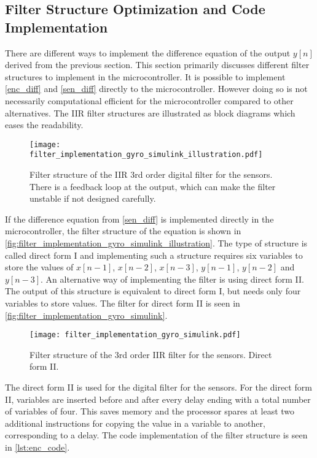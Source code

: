 \subsection{Filter Structure Optimization and Code Implementation}
There are different ways to implement the difference equation of the output $y[n]$ derived from the previous section. This section primarily discusses different filter structures to implement in the microcontroller. It is possible to implement \autoref{enc_diff} and \autoref{sen_diff} directly to the microcontroller. However doing so is not necessarily computational efficient for the microcontroller compared to other alternatives. The IIR filter structures are illustrated as block diagrams which eases the readability.
\begin{figure}[H]
    \centering
    \texttt{[image: filter\_implementation\_gyro\_simulink\_illustration.pdf]}
    \caption{Filter structure of the IIR 3rd order digital filter for the sensors. There is a feedback loop at the output, which can make the filter unstable if not designed carefully.}
    \label{fig:filter_implementation_gyro_simulink_illustration}
\end{figure} 
If the difference equation from \autoref{sen_diff} is implemented directly in the microcontroller, the filter structure of the equation is shown in \autoref{fig:filter_implementation_gyro_simulink_illustration}. The type of structure is called direct form I \citep[p. 399]{oppenheim} and implementing such a structure requires six variables to store the values of $x[n-1]$, $x[n-2]$, $x[n-3]$, $y[n-1]$, $y[n-2]$ and $y[n-3]$. An alternative way of implementing the filter is using direct form II. The output of this structure is equivalent to direct form I, but needs only four variables to store values. The filter for direct form II is seen in \autoref{fig:filter_implementation_gyro_simulink}.
\begin{figure}[H]
    \centering
    \texttt{[image: filter\_implementation\_gyro\_simulink.pdf]}
    \caption{Filter structure of the 3rd order IIR filter for the sensors. Direct form II.}
    \label{fig:filter_implementation_gyro_simulink}
\end{figure} 
The direct form II is used for the digital filter for the sensors. For the direct form II, variables are inserted before and after every delay ending with a total number of variables of four. This saves memory and the processor spares at least two additional instructions for copying the value in a variable to another, corresponding to a delay. The code implementation of the filter structure is seen in \autoref{lst:enc_code}. 

